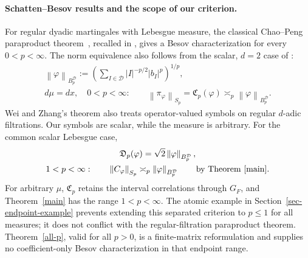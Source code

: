 \documentclass[11pt]{amsart}
\newcommand{\D}{\mathcal D}
\newcommand{\norm}[1]{\left\|#1\right\|}
\begin{document}
\paragraph{Schatten--Besov results and the scope of our criterion.}
For regular dyadic martingales with Lebesgue measure, the classical
Chao--Peng paraproduct theorem~\cite{CP1996}, recalled in
\cite[Theorem 1.1]{WZ2024}, gives a Besov characterization for every
$0<p<\infty$. The norm equivalence also follows from the scalar,
$d=2$ case of \cite[Theorem 1.2]{WZ2024}:
\begin{gather*}
 \norm{\varphi}_{B_p^{\D}}
    :=\left(\sum_{I\in\D}|I|^{-p/2}|b_I|^p\right)^{1/p},\\
 d\mu=dx,\quad0<p<\infty:
 \qquad \norm{\pi_\varphi}_{S_p}
    =\mathfrak C_p(\varphi)\asymp_p\norm{\varphi}_{B_p^{\D}}.
\end{gather*}
Wei and Zhang's theorem also treats operator-valued symbols on
regular $d$-adic filtrations. Our symbols are scalar, while the
measure is arbitrary. For the common scalar Lebesgue case,
\begin{gather*}
 \mathfrak D_p(\varphi)=\sqrt2\norm{\varphi}_{B_p^{\D}},\\
 1<p<\infty:\qquad
 \norm{C_\varphi}_{S_p}\asymp_p\norm{\varphi}_{B_p^{\D}}
 \qquad\text{by Theorem~\ref{main}}.
\end{gather*}
For arbitrary $\mu$, $\mathfrak C_p$ retains the interval correlations
through $G_F$, and Theorem~\ref{main} has the range $1<p<\infty$.
The atomic example in Section~\ref{sec-endpoint-example} prevents extending this separated
criterion to $p\le1$ for all measures; it does not conflict with the
regular-filtration paraproduct theorem. Theorem~\ref{all-p}, valid
for all $p>0$, is a finite-matrix reformulation and supplies no
coefficient-only Besov characterization in that endpoint range.
\end{document}

